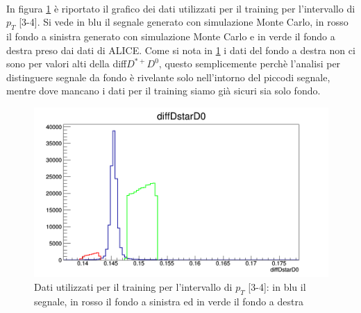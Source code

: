 \\In figura \ref{fig:dati_training} è riportato il grafico dei dati utilizzati per il training per l'intervallo di $p_T$ [3-4]. Si vede in blu il segnale generato con simulazione Monte Carlo, in rosso il fondo a sinistra generato con simulazione Monte Carlo e in verde il fondo a destra preso dai dati di ALICE. Come si nota in \ref{fig:dati_training} i dati del fondo a destra non ci sono per valori alti della diff${D^{*+}D^0}$, questo semplicemente perchè l'analisi per distinguere segnale da fondo è rivelante solo nell'intorno del piccodi segnale, mentre dove mancano i dati per il training siamo già sicuri sia solo fondo. 


    \begin{figure}[htbp] 
        \centering
        \includegraphics[width=0.9\linewidth]{training&testing/diffDstarD0_training_3_4_ok.png}
        \caption{Dati utilizzati per il training per l'intervallo di $p_T$ [3-4]: in blu il segnale, in rosso il fondo a sinistra ed in verde il fondo a destra }
        \label{fig:dati_training}
    \end{figure}
    
    
    

